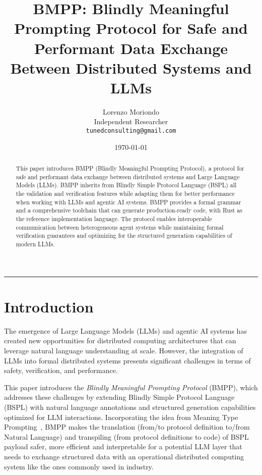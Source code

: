 \documentclass[11pt,a4paper]{article}
\title{\Large\bfseries BMPP: Blindly Meaningful Prompting Protocol for Safe and Performant Data Exchange Between Distributed Systems and LLMs}
\author{
	\large Lorenzo Moriondo\\
	\normalsize Independent Researcher\\
	\texttt{tunedconsulting@gmail.com}
}
\date{\today}
\begin{document}
	
	\maketitle
	\thispagestyle{empty}
	
	\vspace{1cm}
	
	\begin{abstract}
		\noindent This paper introduces BMPP (Blindly Meaningful Prompting Protocol), a protocol for safe and performant data exchange between distributed systems and Large Language Models (LLMs). BMPP inherits from Blindly Simple Protocol Language (BSPL) all the validation and verification features while adapting them for better performance when working with LLMs and agentic AI systems. BMPP provides a formal grammar and a comprehensive toolchain that can generate production-ready code, with Rust as the reference implementation language. The protocol enables interoperable communication between heterogeneous agent systems while maintaining formal verification guarantees and optimizing for the structured generation capabilities of modern LLMs.
	\end{abstract}
	
	\vspace{0.5cm}
	\hrule
	\vspace{0.5cm}
	
	\tableofcontents
	\newpage
	
	
	\section{Introduction}
	\label{sec:introduction}
	
	The emergence of Large Language Models (LLMs) and agentic AI systems has created new opportunities for distributed computing architectures that can leverage natural language understanding at scale. However, the integration of LLMs into formal distributed systems presents significant challenges in terms of safety, verification, and performance. 
	
	This paper introduces the \emph{Blindly Meaningful Prompting Protocol} (BMPP), which addresses these challenges by extending Blindly Simple Protocol Language (BSPL) with natural language annotations and structured generation capabilities optimized for LLM interactions. Incorporating the idea from Meaning Type Prompting~\cite{vibelang-rs}, BMPP makes the translation (from/to protocol definition to/from Natural Language) and transpiling (from protocol definitions to code) of BSPL payload safer, more efficient and interpretable for a potential LLM layer that needs to exchange structured data with an operational distributed computing system like the ones commonly used in industry.
	
\end{document}
